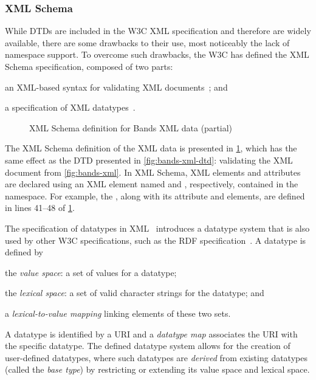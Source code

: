 \subsubsection{XML Schema}
\label{sec:xml-schema}

While \acp{DTD} are included in the \ac{W3C} \ac{XML} specification and therefore are widely available, there are some
drawbacks to their use, most noticeably the lack of namespace support.
%
To overcome such drawbacks, the \ac{W3C} has defined the \ac{XML} Schema specification, composed of two parts:
%
\begin{inparaenum}[(i)]
\item an \ac{XML}-based syntax for validating \ac{XML} documents~\cite{ThompsonBeechMaloney:2004aa}; and
\item a specification of \ac{XML} datatypes~\cite{BironMalhotra:2004aa}.
\end{inparaenum}


\begin{figure}[p]
  \centering
  
  \caption{XML Schema definition for Bands XML data (partial)}
\label{fig:bands-xml-xsd}
\end{figure}
%
The \ac{XML} Schema definition of the \usecase \ac{XML} data is presented in \cref{fig:bands-xml-xsd}, which has the
same effect as the \ac{DTD} presented in \cref{fig:bands-xml-dtd}: validating the \ac{XML} document from
\cref{fig:bands-xml}.
%
In \ac{XML} Schema, \ac{XML} elements and attributes are declared using an \ac{XML} element named 
and , respectively, contained in the 
namespace.
%
For example, the , along with its  attribute and  elements, are
defined in lines 41--48 of \cref{fig:bands-xml-xsd}.


The specification of datatypes in \ac{XML}~\cite{ThompsonBeechMaloney:2004aa} introduces a datatype system that is also
used by other \ac{W3C} specifications, such as the \ac{RDF} specification~\cite{ManolaMiller:2004aa}.
%
A datatype is defined by
%
\begin{inparaenum}[(a)]
\item the \emph{value space}: a set of values for a datatype; 
\item the \emph{lexical space}: a set of valid character strings for the datatype; and
\item a \emph{lexical-to-value mapping} linking elements of these two sets.
\end{inparaenum}
%
A datatype is identified by a \ac{URI} and a \emph{datatype map} associates the \ac{URI} with the specific datatype.
%
The defined datatype system allows for the creation of user-defined datatypes, where such datatypes are \emph{derived}
from existing datatypes (called the \emph{base type}) by restricting or extending its value space and lexical space.


